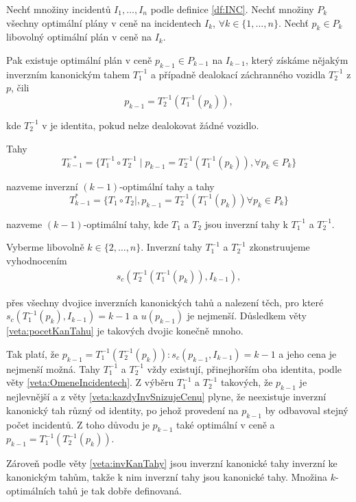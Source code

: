 \begin{veta}\label{veta:vztahOptim}
  Nechť množiny incidentů $I_1, \dots, I_n$ podle definice \ref{df:INC}.
  Nechť množiny $P_{k}$ všechny optimální plány v ceně na incidentech $I_k$, $\forall k \in \{ 1, \dots, n \}$.
  Nechť $p_k \in P_k$ libovolný optimální plán v ceně na $I_k$.

  Pak existuje optimální plán v ceně $p_{k-1} \in P_{k-1}$ na $I_{k-1}$, který získáme nějakým inverzním kanonickým tahem $T^{-1}_1$ a případně dealokací záchranného vozidla $T^{-1}_2$ z $p$,
  čili
  \begin{equation*}
    p_{k-1} = T^{-1}_2(T^{-1}_1(p_k)),
  \end{equation*}

  kde $T^{-1}_2$ v je identita, pokud nelze dealokovat žádné vozidlo.

  Tahy 
  \begin{equation*}
    T^{-*}_{k-1} = \{ T^{-1}_1 \circ T^{-1}_2 \mid p_{k-1} = T^{-1}_2(T^{-1}_1(p_k)), \forall p_k \in P_k \}
  \end{equation*}

  nazveme inverzní $(k-1)$-optimální tahy a tahy
  \begin{equation*}
    T^{*}_{k-1} = \{ T_1 \circ T_2 \mid , p_{k-1} = T^{-1}_2(T^{-1}_1(p_k)) \forall p_k \in P_k \}
  \end{equation*}

  nazveme $(k-1)$-optimální tahy, kde $T_1$ a $T_2$ jsou inverzní tahy k $T^{-1}_1$ a $T^{-1}_2$.

\end{veta}
\begin{dukaz}
  Vyberme libovolně $k \in \{ 2, \dots, n \}$. Inverzní tahy $T^{-1}_1$ a $T^{-1}_2$ zkonstruujeme vyhodnocením 
  \begin{align*}
  s_c(T^{-1}_2(T^{-1}_1(p_{k})), I_{k-1}),
  \end{align*}

  přes všechny dvojice inverzních kanonických tahů a nalezení těch,
  pro které $s_c(T^{-1}_1(p_{k}), I_{k-1}) = k-1$ a $u(p_{k-1})$ je nejmenší.
  Důsledkem věty \ref{veta:pocetKanTahu} je takových dvojic konečně mnoho.

  Tak platí, že $p_{k-1} = T^{-1}_1(T^{-1}_2(p_{k})) \colon s_c(p_{k-1}, I_{k-1}) = k-1$ a jeho cena je nejmenší možná.
  Tahy $T^{-1}_1$ a $T^{-1}_2$ vždy existují, přinejhorším oba identita, podle věty \ref{veta:OmeneIncidentech}.
  Z výběru $T^{-1}_1$ a $T^{-1}_2$ takových, že $p_{k-1}$ je nejlevnější a z věty \ref{veta:kazdyInvSnizujeCenu} plyne,
  že neexistuje inverzní kanonický tah různý od identity,
  po jehož provedení na $p_{k-1}$ by odbavoval stejný počet incidentů. 
  Z toho důvodu je $p_{k-1}$ také optimální v ceně a $p_{k-1} = T^{-1}_1(T^{-1}_2(p_{k}))$.

  Zároveň podle věty \ref{veta:invKanTahy} jsou inverzní kanonické tahy inverzní ke kanonickým tahům, takže k nim inverzní tahy jsou kanonické tahy.
  Množina $k$-optimálních tahů je tak dobře definovaná.
\end{dukaz}

